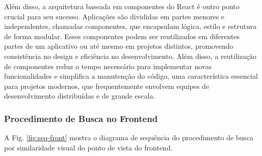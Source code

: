 Além disso, a arquitetura baseada em componentes do React é outro ponto crucial para seu sucesso. Aplicações são divididas em partes menores e independentes, chamadas componentes, que encapsulam lógica, estilo e estrutura de forma modular. Esses componentes podem ser reutilizados em diferentes partes de um aplicativo ou até mesmo em projetos distintos, promovendo consistência no design e eficiência no desenvolvimento. Além disso, a reutilização de componentes reduz o tempo necessário para implementar novas funcionalidades e simplifica a manutenção do código, uma característica essencial para projetos modernos, que frequentemente envolvem equipes de desenvolvimento distribuídas e de grande escala.


\subsubsection{Procedimento de Busca no Frontend}
\label{sec:si-front-busca}

A Fig. \ref{fig:seq-front} mostra o diagrama de sequência do procedimento de busca por similaridade visual do ponto de vista do frontend.


